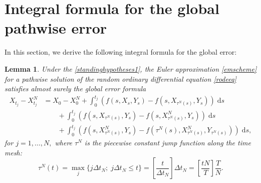 \documentclass[reqno,12pt]{amsart}
\theoremstyle{plain} %
\newtheorem{lemma}{Lemma}[section]
\theoremstyle{definition} %
\begin{document}
\section{Integral formula for the global pathwise error}

In this section, we derive the following integral formula for the global error:
\begin{lemma}
    \label{lemglobalerrorintegralformula}
    Under the \cref{standinghypotheses1}, the Euler approximation \eqref{emscheme} for a pathwise solution of the random ordinary differential equation \eqref{rodeeq} satisfies almost surely the global error formula
    \begin{equation}
        \label{globalerrorintegralformula}
        \begin{aligned}
            X_{t_j} - X_{t_j}^N & = X_0 - X_0^N + \int_0^{t_j} \left( f(s, X_s, Y_s) - f(s, X_{\tau^N(s)}, Y_s) \right)\;\mathrm{d}s  \\ 
            & \qquad + \int_{0}^{t_j} \left( f(s, X_{\tau^N(s)}, Y_s) - f(s, X_{\tau^N(s)}^N, Y_s) \right)\;\mathrm{d}s \\
            & \qquad + \int_0^{t_j} \left( f(s, X_{\tau^N(s)}^N, Y_s) - f(\tau^N(s), X_{\tau^N(s)}^N, Y_{\tau^N(s)}) \right)\;\mathrm{d}s,
        \end{aligned}
    \end{equation}
    for $j = 1, \ldots, N,$ where $\tau^N$ is the piecewise constant jump function along the time mesh:
    \begin{equation}
        \label{tauNt}
        \tau^N(t) = \max_j\{j\Delta t_N; \; j\Delta t_N \leq t\} = \left[\frac{t}{\Delta t_N}\right]\Delta t_N = \left[\frac{tN}{T}\right]\frac{T}{N}.
    \end{equation}
\end{lemma}
\end{document}
